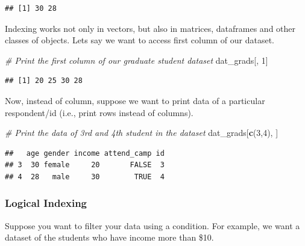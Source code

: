 \documentclass[
]{article}
\newenvironment{Shaded}{\begin{snugshade}}{\end{snugshade}}
\newcommand{\CommentTok}[1]{\textcolor[rgb]{0.56,0.35,0.01}{\textit{#1}}}
\newcommand{\DecValTok}[1]{\textcolor[rgb]{0.00,0.00,0.81}{#1}}
\newcommand{\FunctionTok}[1]{\textcolor[rgb]{0.13,0.29,0.53}{\textbf{#1}}}
\newcommand{\NormalTok}[1]{#1}
\newcommand{\SpecialCharTok}[1]{\textcolor[rgb]{0.81,0.36,0.00}{\textbf{#1}}}
\begin{document}
\begin{verbatim}
## [1] 30 28
\end{verbatim}

Indexing works not only in vectors, but also in matrices, dataframes and
other classes of objects. Lets say we want to access first column of our
dataset.

\begin{Shaded}
\begin{Highlighting}[]
\CommentTok{\# Print the first column of our graduate student dataset}
\NormalTok{dat\_grads[, }\DecValTok{1}\NormalTok{]}
\end{Highlighting}
\end{Shaded}

\begin{verbatim}
## [1] 20 25 30 28
\end{verbatim}

Now, instead of column, suppose we want to print data of a particular
respondent/id (i.e., print rows instead of columns).

\begin{Shaded}
\begin{Highlighting}[]
\CommentTok{\# Print the data of 3rd and 4th student in the dataset}
\NormalTok{dat\_grads[}\FunctionTok{c}\NormalTok{(}\DecValTok{3}\NormalTok{,}\DecValTok{4}\NormalTok{), ]}
\end{Highlighting}
\end{Shaded}

\begin{verbatim}
##   age gender income attend_camp id
## 3  30 female     20       FALSE  3
## 4  28   male     30        TRUE  4
\end{verbatim}

\subsubsection{Logical Indexing}\label{logical-indexing}

Suppose you want to filter your data using a condition. For example, we
want a dataset of the students who have income more than \$10.

\begin{Shaded}
\end{Shaded}
\end{document}
